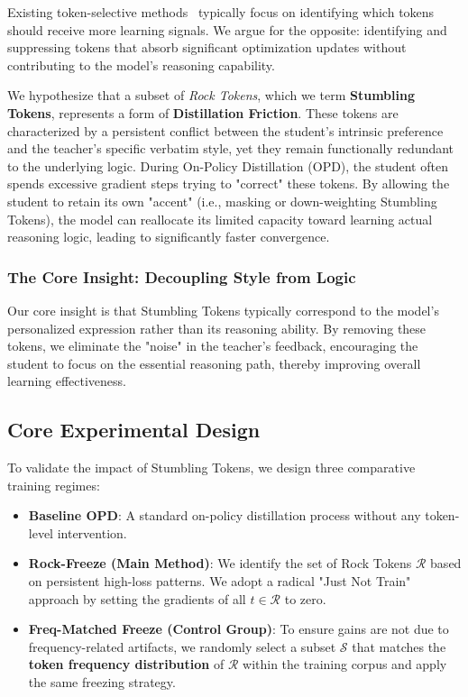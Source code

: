 

Existing token-selective methods~\cite{wangbeyond} typically focus on identifying which tokens should receive more learning signals. We argue for the opposite: identifying and suppressing tokens that absorb significant optimization updates without contributing to the model's reasoning capability. 

We hypothesize that a subset of \textit{Rock Tokens}, which we term \textbf{Stumbling Tokens}, represents a form of \textbf{Distillation Friction}. These tokens are characterized by a persistent conflict between the student's intrinsic preference and the teacher's specific verbatim style, yet they remain functionally redundant to the underlying logic. During On-Policy Distillation (OPD), the student often spends excessive gradient steps trying to "correct" these tokens. By allowing the student to retain its own "accent" (i.e., masking or down-weighting Stumbling Tokens), the model can reallocate its limited capacity toward learning actual reasoning logic, leading to significantly faster convergence.

\subsubsection{The Core Insight: Decoupling Style from Logic}
Our core insight is that Stumbling Tokens typically correspond to the model’s personalized expression rather than its reasoning ability. By removing these tokens, we eliminate the "noise" in the teacher's feedback, encouraging the student to focus on the essential reasoning path, thereby improving overall learning effectiveness.

\subsection{Core Experimental Design}
To validate the impact of Stumbling Tokens, we design three comparative training regimes:

\begin{itemize}
    \item \textbf{Baseline OPD}: A standard on-policy distillation process without any token-level intervention.
    \item \textbf{Rock-Freeze (Main Method)}: We identify the set of Rock Tokens $\mathcal{R}$ based on persistent high-loss patterns. We adopt a radical "Just Not Train" approach by setting the gradients of all $t \in \mathcal{R}$ to zero.
    \item \textbf{Freq-Matched Freeze (Control Group)}: To ensure gains are not due to frequency-related artifacts, we randomly select a subset $\mathcal{S}$ that matches the \textbf{token frequency distribution} of $\mathcal{R}$ within the training corpus and apply the same freezing strategy.
\end{itemize}

